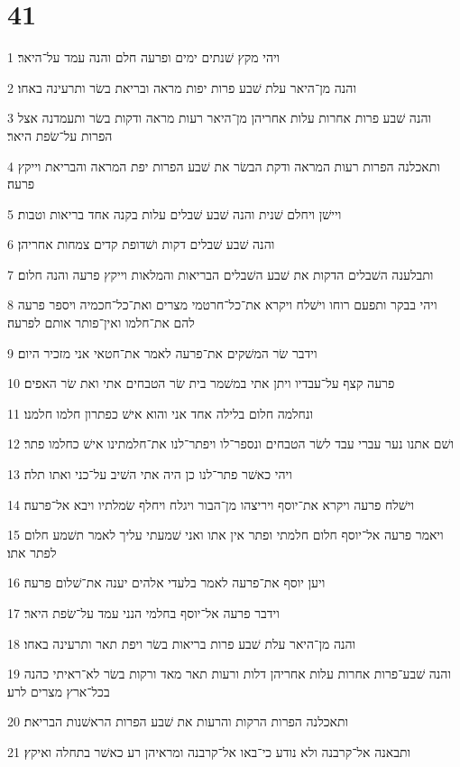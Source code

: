\chapter{41}

\par 1 ויהי מקץ שׁנתים ימים ופרעה חלם והנה עמד על־היאר׃
\par 2 והנה מן־היאר עלת שׁבע פרות יפות מראה ובריאת בשׂר ותרעינה באחו׃
\par 3 והנה שׁבע פרות אחרות עלות אחריהן מן־היאר רעות מראה ודקות בשׂר ותעמדנה אצל הפרות על־שׂפת היאר׃
\par 4 ותאכלנה הפרות רעות המראה ודקת הבשׂר את שׁבע הפרות יפת המראה והבריאת וייקץ פרעה׃
\par 5 ויישׁן ויחלם שׁנית והנה שׁבע שׁבלים עלות בקנה אחד בריאות וטבות׃
\par 6 והנה שׁבע שׁבלים דקות ושׁדופת קדים צמחות אחריהן׃
\par 7 ותבלענה השׁבלים הדקות את שׁבע השׁבלים הבריאות והמלאות וייקץ פרעה והנה חלום׃
\par 8 ויהי בבקר ותפעם רוחו וישׁלח ויקרא את־כל־חרטמי מצרים ואת־כל־חכמיה ויספר פרעה להם את־חלמו ואין־פותר אותם לפרעה׃
\par 9 וידבר שׂר המשׁקים את־פרעה לאמר את־חטאי אני מזכיר היום׃
\par 10 פרעה קצף על־עבדיו ויתן אתי במשׁמר בית שׂר הטבחים אתי ואת שׂר האפים׃
\par 11 ונחלמה חלום בלילה אחד אני והוא אישׁ כפתרון חלמו חלמנו׃
\par 12 ושׁם אתנו נער עברי עבד לשׂר הטבחים ונספר־לו ויפתר־לנו את־חלמתינו אישׁ כחלמו פתר׃
\par 13 ויהי כאשׁר פתר־לנו כן היה אתי השׁיב על־כני ואתו תלה׃
\par 14 וישׁלח פרעה ויקרא את־יוסף ויריצהו מן־הבור ויגלח ויחלף שׂמלתיו ויבא אל־פרעה׃
\par 15 ויאמר פרעה אל־יוסף חלום חלמתי ופתר אין אתו ואני שׁמעתי עליך לאמר תשׁמע חלום לפתר אתו׃
\par 16 ויען יוסף את־פרעה לאמר בלעדי אלהים יענה את־שׁלום פרעה׃
\par 17 וידבר פרעה אל־יוסף בחלמי הנני עמד על־שׂפת היאר׃
\par 18 והנה מן־היאר עלת שׁבע פרות בריאות בשׂר ויפת תאר ותרעינה באחו׃
\par 19 והנה שׁבע־פרות אחרות עלות אחריהן דלות ורעות תאר מאד ורקות בשׂר לא־ראיתי כהנה בכל־ארץ מצרים לרע׃
\par 20 ותאכלנה הפרות הרקות והרעות את שׁבע הפרות הראשׁנות הבריאת׃
\par 21 ותבאנה אל־קרבנה ולא נודע כי־באו אל־קרבנה ומראיהן רע כאשׁר בתחלה ואיקץ׃
